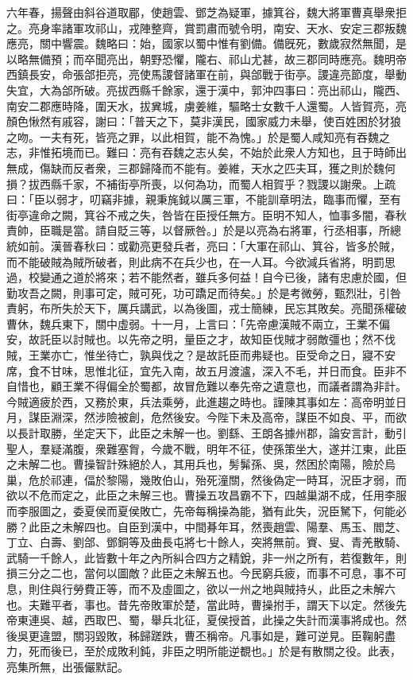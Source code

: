 \begin{pinyinscope}
六年春，揚聲由斜谷道取郿，使趙雲、鄧芝為疑軍，據箕谷，魏大將軍曹真舉衆拒之。亮身率諸軍攻祁山，戎陣整齊，賞罰肅而號令明，南安、天水、安定三郡叛魏應亮，關中響震。魏略曰：始，國家以蜀中惟有劉備。備旣死，數歲寂然無聞，是以略無備預；而卒聞亮出，朝野恐懼，隴右、祁山尤甚，故三郡同時應亮。魏明帝西鎮長安，命張郃拒亮，亮使馬謖督諸軍在前，與郃戰于街亭。謖違亮節度，舉動失宜，大為郃所破。亮拔西縣千餘家，還于漢中，郭沖四事曰：亮出祁山，隴西、南安二郡應時降，圍天水，拔兾城，虜姜維，驅略士女數千人還蜀。人皆賀亮，亮顏色愀然有戚容，謝曰：「普天之下，莫非漢民，國家威力未舉，使百姓困於犲狼之吻。一夫有死，皆亮之罪，以此相賀，能不為愧。」於是蜀人咸知亮有吞魏之志，非惟拓境而已。難曰：亮有吞魏之志乆矣，不始於此衆人方知也，且于時師出無成，傷缺而反者衆，三郡歸降而不能有。姜維，天水之匹夫耳，獲之則於魏何損？拔西縣千家，不補街亭所喪，以何為功，而蜀人相賀乎？戮謖以謝衆。上疏曰：「臣以弱才，叨竊非據，親秉旄鉞以厲三軍，不能訓章明法，臨事而懼，至有街亭違命之闕，箕谷不戒之失，咎皆在臣授任無方。臣明不知人，恤事多闇，春秋責帥，臣職是當。請自貶三等，以督厥咎。」於是以亮為右將軍，行丞相事，所總統如前。漢晉春秋曰：或勸亮更發兵者，亮曰：「大軍在祁山、箕谷，皆多於賊，而不能破賊為賊所破者，則此病不在兵少也，在一人耳。今欲減兵省將，明罰思過，校變通之道於將來；若不能然者，雖兵多何益！自今已後，諸有忠慮於國，但勤攻吾之闕，則事可定，賊可死，功可蹻足而待矣。」於是考微勞，甄烈壯，引咎責躬，布所失於天下，厲兵講武，以為後圖，戎士簡練，民忘其敗矣。亮聞孫權破曹休，魏兵東下，關中虛弱。十一月，上言曰：「先帝慮漢賊不兩立，王業不偏安，故託臣以討賊也。以先帝之明，量臣之才，故知臣伐賊才弱敵彊也；然不伐賊，王業亦亡，惟坐待亡，孰與伐之？是故託臣而弗疑也。臣受命之日，寢不安席，食不甘味，思惟北征，宜先入南，故五月渡瀘，深入不毛，并日而食。臣非不自惜也，顧王業不得偏全於蜀都，故冒危難以奉先帝之遺意也，而議者謂為非計。今賊適疲於西，又務於東，兵法乘勞，此進趨之時也。謹陳其事如左：高帝明並日月，謀臣淵深，然涉險被創，危然後安。今陛下未及高帝，謀臣不如良、平，而欲以長計取勝，坐定天下，此臣之未解一也。劉繇、王朗各據州郡，論安言計，動引聖人，羣疑滿腹，衆難塞胷，今歲不戰，明年不征，使孫策坐大，遂并江東，此臣之未解二也。曹操智計殊絕於人，其用兵也，髣髴孫、吳，然困於南陽，險於烏巢，危於祁連，偪於黎陽，幾敗伯山，殆死潼關，然後偽定一時耳，況臣才弱，而欲以不危而定之，此臣之未解三也。曹操五攻昌霸不下，四越巢湖不成，任用李服而李服圖之，委夏侯而夏侯敗亡，先帝每稱操為能，猶有此失，況臣駑下，何能必勝？此臣之未解四也。自臣到漢中，中間朞年耳，然喪趙雲、陽羣、馬玉、閻芝、丁立、白壽、劉郃、鄧銅等及曲長屯將七十餘人，突將無前。賨、叟、青羌散騎、武騎一千餘人，此皆數十年之內所糾合四方之精銳，非一州之所有，若復數年，則損三分之二也，當何以圖敵？此臣之未解五也。今民窮兵疲，而事不可息，事不可息，則住與行勞費正等，而不及虛圖之，欲以一州之地與賊持乆，此臣之未解六也。夫難平者，事也。昔先帝敗軍於楚，當此時，曹操拊手，謂天下以定。然後先帝東連吳、越，西取巴、蜀，舉兵北征，夏侯授首，此操之失計而漢事將成也。然後吳更違盟，關羽毀敗，秭歸蹉跌，曹丕稱帝。凡事如是，難可逆見。臣鞠躬盡力，死而後已，至於成敗利鈍，非臣之明所能逆覩也。」於是有散關之役。此表，亮集所無，出張儼默記。


\end{pinyinscope}
